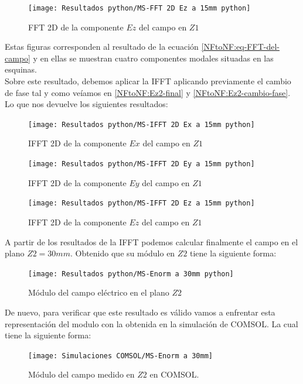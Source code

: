 \documentclass{article}
\begin{document}
\begin{figure}[h] 
  \centering
    \texttt{[image: Resultados python/MS-FFT 2D Ez a 15mm python]}
    \caption{FFT 2D de la componente $Ez$ del campo en $Z1$}
    \label{FFT 2D Ez a 15mm}
\end{figure}
\newpage

Estas figuras corresponden al resultado de la ecuación \eqref{NFtoNF:eq-FFT-del-campo} y en ellas se muestran cuatro componentes modales situadas en las esquinas.\\
Sobre este resultado, debemos aplicar la IFFT aplicando previamente el cambio de fase tal y como veíamos en \eqref{NFtoNF:Ez2-final} y \eqref{NFtoNF:Ez2-cambio-fase}. Lo que nos devuelve los siguientes resultados:

\begin{figure}[h] 
  \centering
    \texttt{[image: Resultados python/MS-IFFT 2D Ex a 15mm python]}
    \caption{IFFT 2D de la componente $Ex$ del campo en $Z1$}
    \label{IFFT 2D Ex a 15mm}
\end{figure}

\begin{figure}[h] 
  \centering
    \texttt{[image: Resultados python/MS-IFFT 2D Ey a 15mm python]}
    \caption{IFFT 2D de la componente $Ey$ del campo en $Z1$}
    \label{IFFT 2D Ex a 15mm}
\end{figure}
\newpage
\begin{figure}[h] 
  \centering
    \texttt{[image: Resultados python/MS-IFFT 2D Ez a 15mm python]}
    \caption{IFFT 2D de la componente $Ez$ del campo en $Z1$}
    \label{IFFT 2D Ex a 15mm}
\end{figure}

\newpage

A partir de los resultados de la IFFT podemos calcular finalmente el campo en el plano $Z2=30mm$. Obtenido que su módulo en $Z2$ tiene la siguiente forma:

\begin{figure}[h] 
  \centering
    \texttt{[image: Resultados python/MS-Enorm a 30mm python]}
    \caption{Módulo del campo eléctrico en el plano $Z2$}
    \label{IFFT 2D Ex a 15mm}
\end{figure}

De nuevo, para verificar que este resultado es válido vamos a enfrentar esta representación del modulo con la obtenida en la simulación de COMSOL. La cual tiene la siguiente forma:

\begin{figure}[h] 
  \centering
    \texttt{[image: Simulaciones COMSOL/MS-Enorm a 30mm]}
    \caption{Módulo del campo medido en $Z2$ en COMSOL.}
    \label{IFFT 2D Ex a 15mm}
\end{figure}
\end{document}
